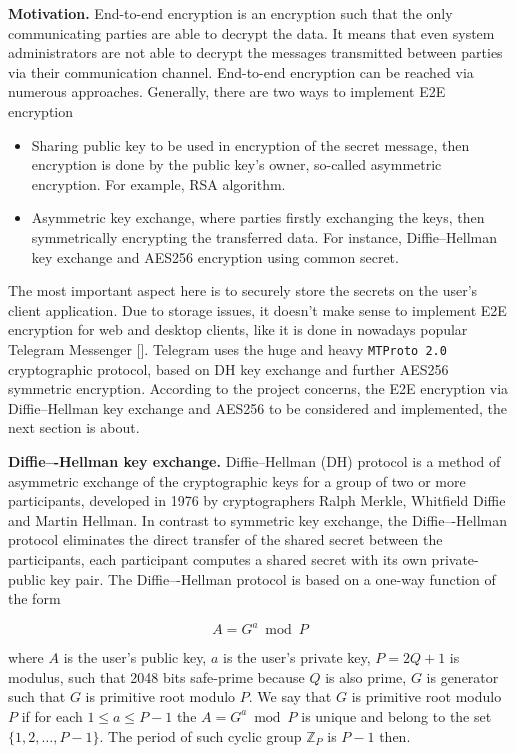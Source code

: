 \textbf{Motivation.} End-to-end encryption is an encryption such that the only communicating parties
are able to decrypt the data.
It means that even system administrators are not able to decrypt the messages transmitted between parties
via their communication channel.
End-to-end encryption can be reached via numerous approaches.
Generally, there are two ways to implement E2E encryption
\begin{itemize}
    \item Sharing public key to be used in encryption of the secret message, then encryption is done by the
    public key's owner, so-called asymmetric encryption.
    For example, RSA algorithm.
    \item Asymmetric key exchange, where parties firstly exchanging the keys, then symmetrically encrypting
    the transferred data.
    For instance, Diffie--Hellman key exchange and AES256 encryption using common secret.
\end{itemize}
The most important aspect here is to securely store the secrets on the user's client application.
Due to storage issues, it doesn't make sense to implement E2E encryption for web
and desktop clients, like it is done in nowadays popular Telegram Messenger
[\cite{job2015modified,suvsanka2017security,lee2017security}].
Telegram uses the huge and heavy \texttt{MTProto 2.0} cryptographic protocol, based on DH key exchange and further AES256
symmetric encryption.
According to the project concerns, the E2E encryption via Diffie--Hellman key exchange and AES256
to be considered and implemented, the next section is about.

\textbf{Diffie–-Hellman key exchange.} Diffie--Hellman (DH) protocol is a method of asymmetric exchange
of the cryptographic keys for a group of two or more participants,
developed in 1976 by cryptographers Ralph Merkle, Whitfield Diffie and Martin Hellman.
In contrast to symmetric key exchange, the Diffie–-Hellman protocol eliminates the direct transfer of the shared secret
between the participants, each participant computes a shared secret with its own private-public key pair.
The Diffie–-Hellman protocol is based on a one-way function of the form

\begin{equation}
    A = G ^ a \bmod P \label{eq:equation}
\end{equation}

where $A$ is the user's public key,
$a$ is the user's private key,
$P=2Q+1$ is modulus, such that 2048 bits safe-prime because $Q$ is also prime,
$G$ is generator such that $G$ is primitive root modulo $P$.
We say that $G$ is primitive root modulo $P$ if for each $1 \leq a \leq P - 1$ the $A = G ^ a \bmod P$
is unique and belong to the set $\{1, 2, \dots, P-1\}$.
The period of such cyclic group $\mathbb{Z}_{P}$ is $P-1$ then.

